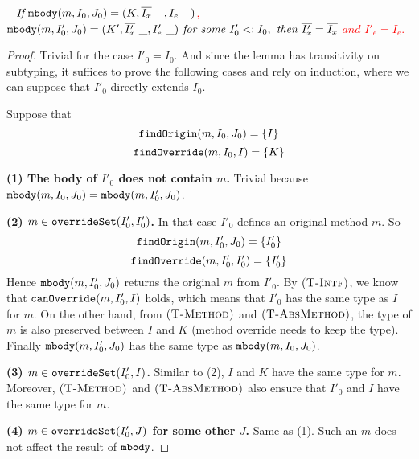 \textcolor{red}{
\begin{lemma}~\label{lemma2_new}
$\textit{If } \texttt{mbody}(m, I_0, J_0) = (K, \overline{I_x}\ \_, I_e\ \_)$, $\texttt{mbody}(m, I'_0, J_0) = (K', \overline{I'_x}\ \_, I'_e\ \_) \textit{ for some }I'_0 <: I_0, \textit{ then }
\overline{I'_x} = \overline{I_x}$ $\textit{and } I'_e = I_e.$
\end{lemma}}
\begin{proof}
	
Trivial for the case $I'_0 = I_0$. And since the lemma has transitivity on subtyping, it suffices to prove the following cases and rely on induction, where we can suppose that $I'_0$ directly extends $I_0$.

Suppose that $$\texttt{findOrigin}(m, I_0, J_0) = \{I\}$$ $$\texttt{findOverride}(m, I_0, I) = \{K\}$$

\textbf{(1) The body of $I'_0$ does not contain $m$.} Trivial because $\texttt{mbody}(m, I_0, J_0) = \texttt{mbody}(m, I'_0, J_0)$. 

\textbf{(2) $m \in \texttt{overrideSet}(I'_0, I'_0)$.} In that case $I'_0$ defines an original method $m$.
 So
$$\texttt{findOrigin}(m, I'_0, J_0) = \{I'_0\}$$ $$\texttt{findOverride}(m, I'_0, I'_0) = \{I'_0\}$$
Hence $\texttt{mbody}(m, I'_0, J_0)$ returns the original $m$ from $I'_0$. By $\textsc{(T-Intf)}$, we know that $\texttt{canOverride}(m, I'_0, I)$ holds, which means that $I'_0$ has the same type as $I$ for $m$. On the other hand, from $\textsc{(T-Method)}$ and $\textsc{(T-AbsMethod)}$, the type of $m$ is also preserved between $I$ and $K$ (method override needs to keep the type). Finally $\texttt{mbody}(m, I'_0, J_0)$ has the same type as $\texttt{mbody}(m, I_0, J_0)$.

\textbf{(3) $m \in \texttt{overrideSet}(I'_0, I)$.} Similar to (2), $I$ and $K$ have the same type for $m$. Moreover, $\textsc{(T-Method)}$ and $\textsc{(T-AbsMethod)}$ also ensure that $I'_0$ and $I$ have the same type for $m$. 

\textbf{(4) $m \in \texttt{overrideSet}(I'_0, J)$ for some other $J$.} Same as (1). Such an $m$ does not affect the result of $\texttt{mbody}$.
\end{proof}


